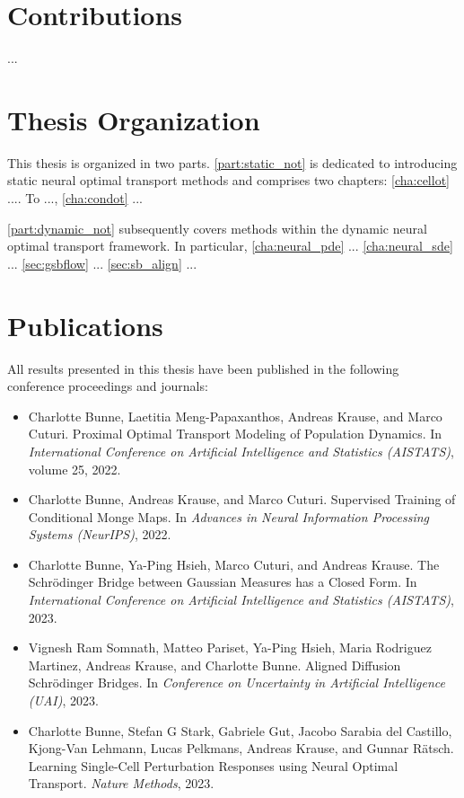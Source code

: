 \section{Contributions}
...

\section{Thesis Organization}

This thesis is organized in two parts. \cref{part:static_not} is dedicated to introducing static neural optimal transport methods and comprises two chapters:
\cref{cha:cellot} .... To ..., \cref{cha:condot} ...

\cref{part:dynamic_not} subsequently covers methods within the dynamic neural optimal transport framework. In particular, \cref{cha:neural_pde} ...
\cref{cha:neural_sde} ...
\cref{sec:gsbflow} ... \cref{sec:sb_align} ...


\section{Publications}
All results presented in this thesis have been published in the following conference proceedings and journals:

\begin{itemize}
	\item[] Charlotte Bunne, Laetitia Meng-Papaxanthos, Andreas Krause, and Marco Cuturi. Proximal Optimal Transport Modeling of Population Dynamics. In \textit{International Conference on Artificial Intelligence and Statistics (AISTATS)}, volume 25, 2022.
	\item[] Charlotte Bunne, Andreas Krause, and Marco Cuturi. Supervised Training of Conditional Monge Maps. In \textit{Advances in Neural Information Processing Systems (NeurIPS)}, 2022.
	\item[] Charlotte Bunne, Ya-Ping Hsieh, Marco Cuturi, and Andreas Krause. The Schr{\"o}dinger Bridge between Gaussian Measures has a Closed Form. In \textit{International Conference on Artificial Intelligence and Statistics (AISTATS)}, 2023.
	\item[] Vignesh Ram Somnath, Matteo Pariset, Ya-Ping Hsieh, Maria Rodriguez Martinez, Andreas Krause, and Charlotte Bunne. Aligned Diffusion Schr{\"o}dinger Bridges. In \textit{Conference on Uncertainty in Artificial Intelligence (UAI)}, 2023.
	\item[] Charlotte Bunne, Stefan G Stark, Gabriele Gut, Jacobo Sarabia del Castillo, Kjong-Van Lehmann, Lucas Pelkmans, Andreas Krause, and Gunnar R{\"a}tsch. Learning Single-Cell Perturbation Responses using Neural Optimal Transport. \textit{Nature Methods}, 2023.
\end{itemize}

